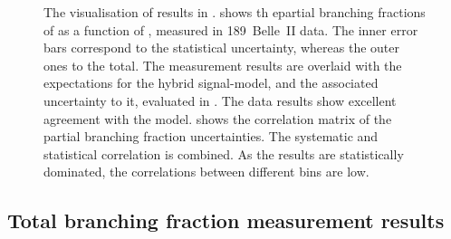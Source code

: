 \begin{figure}[htbp!]
    \centering
    \caption{\label{fig:partial_and_correlation} 
    The visualisation of results in  .
     shows th epartial branching fractions of \BtoXsgamma 
    as a function of \EB, measured in 189~\invfb Belle~II data.
    The inner error bars correspond to the statistical uncertainty, whereas the outer ones to the total.
    The measurement results are overlaid with the expectations for the hybrid signal-model, and the associated uncertainty to it, evaluated in .
    The data results show excellent agreement with the model.
     shows 
    the correlation matrix of the partial branching fraction uncertainties.
    The systematic and statistical correlation is combined.
    As the results are statistically dominated, the correlations between different \EB bins are low.
    }
\end{figure}

\subsection{Total branching fraction measurement results}\label{sec:total_branching_fraction_results}

